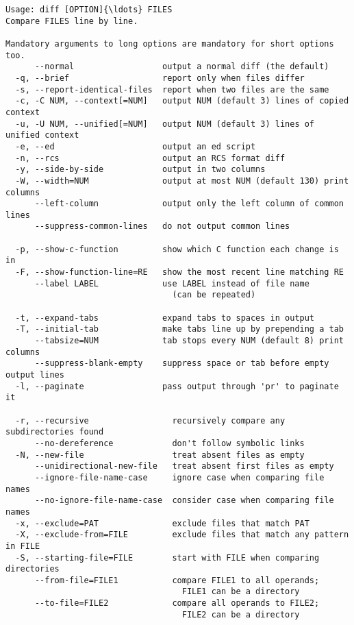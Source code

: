 \documentclass[11pt]{article}
\begin{document}
    \begin{Verbatim}[commandchars=\\\{\}]
Usage: diff [OPTION]{\ldots} FILES
Compare FILES line by line.

Mandatory arguments to long options are mandatory for short options too.
      --normal                  output a normal diff (the default)
  -q, --brief                   report only when files differ
  -s, --report-identical-files  report when two files are the same
  -c, -C NUM, --context[=NUM]   output NUM (default 3) lines of copied context
  -u, -U NUM, --unified[=NUM]   output NUM (default 3) lines of unified context
  -e, --ed                      output an ed script
  -n, --rcs                     output an RCS format diff
  -y, --side-by-side            output in two columns
  -W, --width=NUM               output at most NUM (default 130) print columns
      --left-column             output only the left column of common lines
      --suppress-common-lines   do not output common lines

  -p, --show-c-function         show which C function each change is in
  -F, --show-function-line=RE   show the most recent line matching RE
      --label LABEL             use LABEL instead of file name
                                  (can be repeated)

  -t, --expand-tabs             expand tabs to spaces in output
  -T, --initial-tab             make tabs line up by prepending a tab
      --tabsize=NUM             tab stops every NUM (default 8) print columns
      --suppress-blank-empty    suppress space or tab before empty output lines
  -l, --paginate                pass output through 'pr' to paginate it

  -r, --recursive                 recursively compare any subdirectories found
      --no-dereference            don't follow symbolic links
  -N, --new-file                  treat absent files as empty
      --unidirectional-new-file   treat absent first files as empty
      --ignore-file-name-case     ignore case when comparing file names
      --no-ignore-file-name-case  consider case when comparing file names
  -x, --exclude=PAT               exclude files that match PAT
  -X, --exclude-from=FILE         exclude files that match any pattern in FILE
  -S, --starting-file=FILE        start with FILE when comparing directories
      --from-file=FILE1           compare FILE1 to all operands;
                                    FILE1 can be a directory
      --to-file=FILE2             compare all operands to FILE2;
                                    FILE2 can be a directory


\end{Verbatim}
\end{document}
